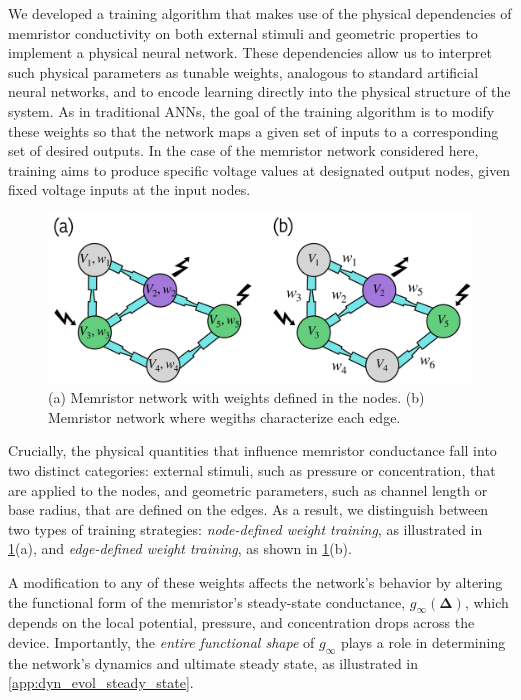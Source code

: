 \documentclass[reprint,superscriptaddress,prb,showkeys]{revtex4-2}
\begin{document}
We developed a training algorithm that makes use of the physical dependencies of memristor conductivity on both external stimuli and geometric properties to implement a physical neural network. These dependencies allow us to interpret such physical parameters as tunable weights, analogous to standard artificial neural networks, and to encode learning directly into the physical structure of the system. As in traditional ANNs, the goal of the training algorithm is to modify these weights so that the network maps a given set of inputs to a corresponding set of desired outputs. In the case of the memristor network considered here, training aims to produce specific voltage values at designated output nodes, given fixed voltage inputs at the input nodes.
\begin{figure}[!h]
    \centering
    \includegraphics[width=0.8\columnwidth]{plots/training/two_types_weights.pdf}
    \caption{(a) Memristor network with weights defined in the nodes. (b) Memristor network where wegiths characterize each edge.}
    \label{fig:two_types_weights}
\end{figure} 
Crucially, the physical quantities that influence memristor conductance fall into two distinct categories: external stimuli, such as pressure or concentration, that are applied to the nodes, and geometric parameters, such as channel length or base radius, that are defined on the edges. As a result, we distinguish between two types of training strategies: \emph{node-defined weight training}, as illustrated in \cref{fig:two_types_weights}(a), and \emph{edge-defined weight training}, as shown in \cref{fig:two_types_weights}(b).

A modification to any of these weights affects the network's behavior by altering the functional form of the memristor’s steady-state conductance, $g_{\infty}(\boldsymbol{\Delta})$, which depends on the local potential, pressure, and concentration drops across the device. Importantly, the \emph{entire functional shape} of $g_{\infty}$ plays a role in determining the network’s dynamics and ultimate steady state, as illustrated in \cref{app:dyn_evol_steady_state}.
\end{document}
